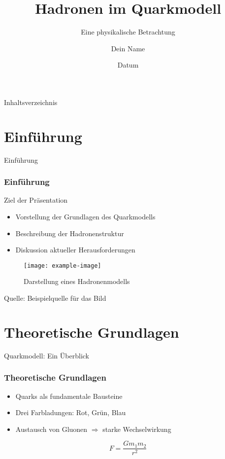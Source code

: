 \documentclass[aspectratio=169]{beamer} %
\title{Hadronen im Quarkmodell}
\subtitle{Eine physikalische Betrachtung}
\author{Dein Name}
\date{Datum}
\begin{document}
	
	\begin{frame}
		\titlepage\end{frame}
	
	\begin{frame}{Inhaltsverzeichnis}
		\tableofcontents
	\end{frame}
	
	\section{Einführung}
	\begin{frame}{Einführung}
		\frametitle{Einführung}
		\begin{block}{Ziel der Präsentation}
			\begin{itemize}
				\item Vorstellung der Grundlagen des Quarkmodells
				\item Beschreibung der Hadronenstruktur
				\item Diskussion aktueller Herausforderungen
			\end{itemize}
		\end{block}
		\begin{figure}
			\centering
			\texttt{[image: example-image]} %
			\caption{Darstellung eines Hadronenmodells}
		\end{figure}
		\vfill
		\tiny Quelle: Beispielquelle für das Bild
	\end{frame}
	
	\section{Theoretische Grundlagen}
	\begin{frame}{Quarkmodell: Ein Überblick}
		\frametitle{Theoretische Grundlagen}
		\begin{itemize}
			\item Quarks als fundamentale Bausteine
			\item Drei Farbladungen: Rot, Grün, Blau
			\item Austausch von Gluonen $\Rightarrow$ starke Wechselwirkung
		\end{itemize}
		\begin{equation}
			F = \frac{Gm_1m_2}{r^2} %
		\end{equation}
	\end{frame}
	
\end{document}
